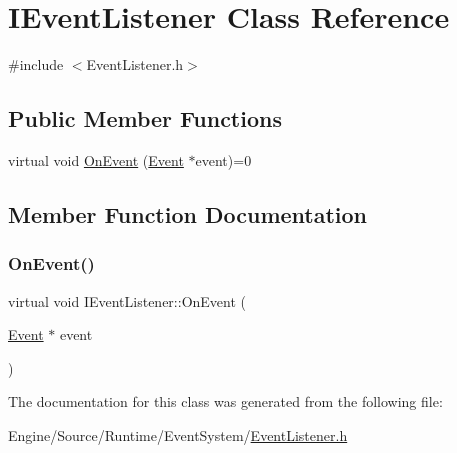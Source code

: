 \hypertarget{class_i_event_listener}{}\section{I\+Event\+Listener Class Reference}
\label{class_i_event_listener}


{\ttfamily \#include $<$Event\+Listener.\+h$>$}

\subsection*{Public Member Functions}
\begin{DoxyCompactItemize}
\item 
virtual void \mbox{\hyperlink{class_i_event_listener_aae24202c284708d35a04dfa6166c79a1}{On\+Event}} (\mbox{\hyperlink{class_event}{Event}} $\ast$event)=0
\end{DoxyCompactItemize}


\subsection{Member Function Documentation}
\mbox{\label{class_i_event_listener_aae24202c284708d35a04dfa6166c79a1}} 
\subsubsection{\texorpdfstring{On\+Event()}{OnEvent()}}
{\footnotesize\ttfamily virtual void I\+Event\+Listener\+::\+On\+Event (\begin{DoxyParamCaption}\item[{\mbox{\hyperlink{class_event}{Event}} $\ast$}]{event }\end{DoxyParamCaption})\hspace{0.3cm}{\ttfamily [pure virtual]}}



The documentation for this class was generated from the following file\+:\begin{DoxyCompactItemize}
\item 
Engine/\+Source/\+Runtime/\+Event\+System/\mbox{\hyperlink{_event_listener_8h}{Event\+Listener.\+h}}\end{DoxyCompactItemize}
